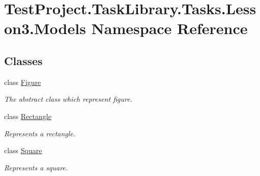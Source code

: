 \hypertarget{namespace_test_project_1_1_task_library_1_1_tasks_1_1_lesson3_1_1_models}{}\section{Test\+Project.\+Task\+Library.\+Tasks.\+Lesson3.\+Models Namespace Reference}
\label{namespace_test_project_1_1_task_library_1_1_tasks_1_1_lesson3_1_1_models}
\subsection*{Classes}
\begin{DoxyCompactItemize}
\item 
class \mbox{\hyperlink{class_test_project_1_1_task_library_1_1_tasks_1_1_lesson3_1_1_models_1_1_figure}{Figure}}
\begin{DoxyCompactList}\small\item\em The abstract class which represent figure. \end{DoxyCompactList}\item 
class \mbox{\hyperlink{class_test_project_1_1_task_library_1_1_tasks_1_1_lesson3_1_1_models_1_1_rectangle}{Rectangle}}
\begin{DoxyCompactList}\small\item\em Represents a rectangle. \end{DoxyCompactList}\item 
class \mbox{\hyperlink{class_test_project_1_1_task_library_1_1_tasks_1_1_lesson3_1_1_models_1_1_square}{Square}}
\begin{DoxyCompactList}\small\item\em Represents a square. \end{DoxyCompactList}\end{DoxyCompactItemize}
